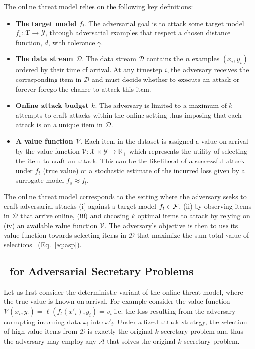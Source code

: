 \begin{ftheo}
The online threat model relies on the following key definitions:
\begin{itemize}[leftmargin=*, itemsep=1pt, topsep=1pt, parsep=1pt]
\item 
\textbf{The target model $f_t$}. The adversarial goal is to attack some target model $f_t : \mathcal{X} \rightarrow \mathcal{Y}$, through adversarial examples that respect a chosen distance function, $d$, with tolerance $\gamma$. %

\item
\textbf{The data stream $\mathcal{D}$}. The data stream $\mathcal{D}$ contains the $n$ examples $(x_i,y_i)$ ordered by their time of arrival. At any timestep $i$, the adversary receives the corresponding item in $\mathcal{D}$ and must decide whether to execute an attack or forever forego the chance to attack this item.

\item
\textbf{Online attack budget $k$}. The adversary is limited to a maximum of $k$ attempts to craft attacks within the online setting thus imposing that each attack is on a unique item in $\mathcal{D}$.

\item
\textbf{A value function $\mathcal{V}$}. Each item in the dataset is assigned a value on arrival by the value function $\mathcal{V}: \mathcal{X} \times \mathcal{Y} \rightarrow \mathbb{R}_+$ which represents the utility of selecting the item to craft an attack. This can be the likelihood of a successful attack under $f_t$ (true value) or a stochastic estimate of the incurred loss given by a surrogate model $f_s \approx f_t$.
\end{itemize}

The online threat model corresponds to the setting where the adversary seeks to craft adversarial attacks (i) against a target model $f_t \in {\mathcal{F}}$, (ii) by observing items in $\mathcal{D}$ that arrive online, (iii) and choosing $k$ optimal items to attack by relying on (iv) an available value function $\mathcal{V}$. The adversary's objective is then to use its value function towards selecting items in $\mathcal{D}$ that maximize the sum total value of selections \setvalue\ (Eq.~\ref{eq:asp}).
\end{ftheo}


\subsection{\algoname\ for Adversarial Secretary Problems}
\label{virtual_plus}
Let us first consider the deterministic variant of the online threat model, where the true value is known on arrival. For example consider the value function $\mathcal{V}(x_i,y_i) = \ell(f_{t}(x'_i),y_i) = v_i$ i.e. the loss resulting from the adversary corrupting incoming data $x_i$ into $x'_i$. Under a fixed attack strategy, the selection of high-value items from $\mathcal{D}$ is exactly the original $k$-secretary problem and thus the adversary may employ any $\mathcal{A}$ that solves the original $k$-secretary problem.

